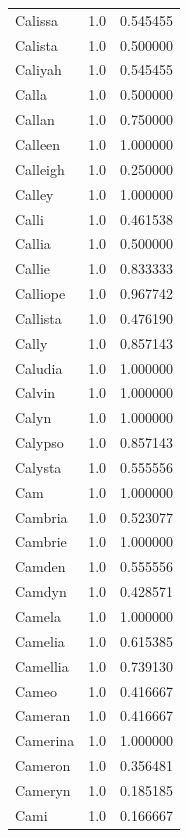 \documentclass[
  letterpaper,
  DIV=11,
  numbers=noendperiod]{scrreprt}
\begin{document}
\begin{tabular}{lrr}
Calissa         &   1.0 &   0.545455 \\
Calista         &   1.0 &   0.500000 \\
Caliyah         &   1.0 &   0.545455 \\
Calla           &   1.0 &   0.500000 \\
Callan          &   1.0 &   0.750000 \\
Calleen         &   1.0 &   1.000000 \\
Calleigh        &   1.0 &   0.250000 \\
Calley          &   1.0 &   1.000000 \\
Calli           &   1.0 &   0.461538 \\
Callia          &   1.0 &   0.500000 \\
Callie          &   1.0 &   0.833333 \\
Calliope        &   1.0 &   0.967742 \\
Callista        &   1.0 &   0.476190 \\
Cally           &   1.0 &   0.857143 \\
Caludia         &   1.0 &   1.000000 \\
Calvin          &   1.0 &   1.000000 \\
Calyn           &   1.0 &   1.000000 \\
Calypso         &   1.0 &   0.857143 \\
Calysta         &   1.0 &   0.555556 \\
Cam             &   1.0 &   1.000000 \\
Cambria         &   1.0 &   0.523077 \\
Cambrie         &   1.0 &   1.000000 \\
Camden          &   1.0 &   0.555556 \\
Camdyn          &   1.0 &   0.428571 \\
Camela          &   1.0 &   1.000000 \\
Camelia         &   1.0 &   0.615385 \\
Camellia        &   1.0 &   0.739130 \\
Cameo           &   1.0 &   0.416667 \\
Cameran         &   1.0 &   0.416667 \\
Camerina        &   1.0 &   1.000000 \\
Cameron         &   1.0 &   0.356481 \\
Cameryn         &   1.0 &   0.185185 \\
Cami            &   1.0 &   0.166667 \\

\end{tabular}
\end{document}
